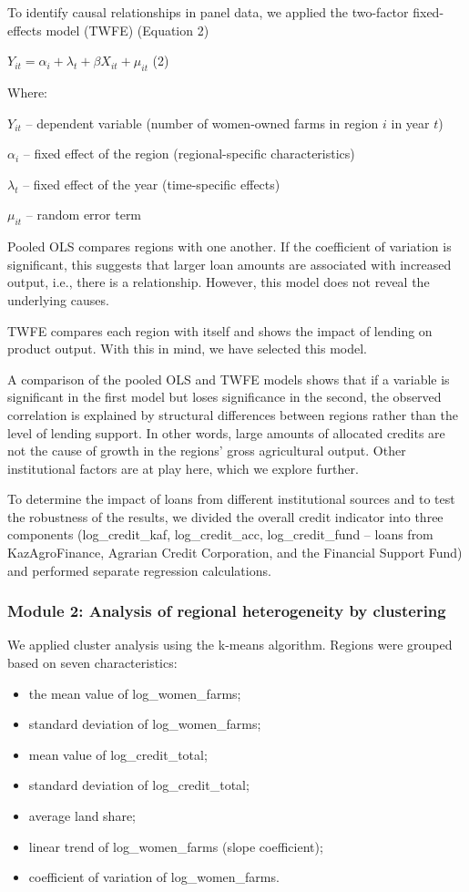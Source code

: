 \documentclass[pdflatex,sn-mathphys-ay]{sn-jnl}
\begin{document}
To identify causal relationships in panel data, we applied the
two-factor fixed-effects model (TWFE) (Equation 2)

$Y_{it} = \alpha_i + \lambda_t + \beta X_{it} + \mu_{it}$ (2)

Where:

$Y_{it}$ -- dependent variable (number of women-owned farms in region $i$ in year $t$)

$\alpha_i$ -- fixed effect of the region (regional-specific characteristics)

$\lambda_t$ -- fixed effect of the year (time-specific effects)

$\mu_{it}$ -- random error term

Pooled OLS compares regions with one another. If the coefficient of
variation is significant, this suggests that larger loan amounts are
associated with increased output, i.e., there is a relationship.
However, this model does not reveal the underlying causes.

TWFE compares each region with itself and shows the impact of lending on
product output. With this in mind, we have selected this model.

A comparison of the pooled OLS and TWFE models shows that if a variable
is significant in the first model but loses significance in the second,
the observed correlation is explained by structural differences between
regions rather than the level of lending support. In other words, large
amounts of allocated credits are not the cause of growth in the regions'
gross agricultural output. Other institutional factors are at play here,
which we explore further.

To determine the impact of loans from different institutional sources
and to test the robustness of the results, we divided the overall credit
indicator into three components (log\_credit\_kaf, log\_credit\_acc,
log\_credit\_fund -- loans from KazAgroFinance, Agrarian Credit
Corporation, and the Financial Support Fund) and performed separate
regression calculations.

\subsubsection{Module 2: Analysis of regional heterogeneity by clustering}

We applied cluster analysis using the k-means algorithm. Regions were
grouped based on seven characteristics:

\begin{itemize}
\item the mean value of log\_women\_farms;
\item standard deviation of log\_women\_farms;
\item mean value of log\_credit\_total;
\item standard deviation of log\_credit\_total;
\item average land share;
\item linear trend of log\_women\_farms (slope coefficient);
\item coefficient of variation of log\_women\_farms.
\end{itemize}
\end{document}
